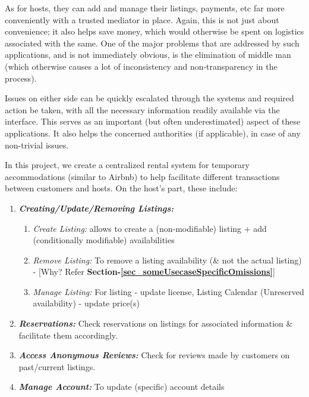 \documentclass[conference]{IEEEtran}
\begin{document}
    As for hosts, they can add and manage their listings, payments, etc far more conveniently with a trusted mediator in place. Again, this is not just about convenience; it also helps save money, which would otherwise be spent on logistics associated with the same. One of the major problems that are addressed by such applications, and is not immediately obvious, is the elimination of middle man (which otherwise causes a lot of inconsistency and non-transparency in the process).
    
    Issues on either side can be quickly escalated through the systems and required action be taken, with all the necessary information readily available via the interface. This serves as an important (but often underestimated) aspect of these applications. It also helps the concerned authorities (if applicable), in case of any non-trivial issues.

    In this project, we create a centralized rental system for temporary accommodations (similar to Airbnb) to help facilitate different transactions between customers and hosts. On the host’s part, these include:
    \begin{enumerate}
        \item \textbf{\textit{Creating/Update/Removing Listings:}}
            \begin{enumerate}
                \item \textit{Create Listing:} allows to create a (non-modifiable) listing  +  add (conditionally modifiable) availabilities
                \item \textit{Remove Listing:} To remove a listing availability (\& not the actual listing)  - [Why? Refer \textbf{Section-\ref{sec_someUsecaseSpecificOmissions}}]
                \item \textit{Manage Listing:} For listing - update license, Listing Calendar (Unreserved availability) - update price(s)
            \end{enumerate}

		\item \textbf{\textit{Reservations:}} Check reservations on listings for associated information \& facilitate them accordingly.
		\item \textbf{\textit{Access Anonymous Reviews:}}  Check for reviews made by customers on past/current listings.
		\item \textbf{\textit{Manage Account:}} To update (specific) account details
	\end{enumerate}
    \vspace{1mm}
    
\end{document}
